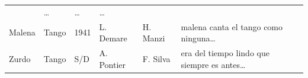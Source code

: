 \documentclass[]{article}
\begin{document}
\begin{longtable}[]{@{}llllll@{}}
\begin{minipage}[t]{0.06\columnwidth}
\end{minipage} & \begin{minipage}[t]{0.11\columnwidth}\raggedright\strut
\ldots{}\strut
\end{minipage} & \begin{minipage}[t]{0.11\columnwidth}\raggedright\strut
\ldots{}\strut
\end{minipage} & \begin{minipage}[t]{0.38\columnwidth}\raggedright\strut
\ldots{}\strut
\end{minipage}\tabularnewline
\begin{minipage}[t]{0.09\columnwidth}\raggedright\strut
Malena\strut
\end{minipage} & \begin{minipage}[t]{0.07\columnwidth}\raggedright\strut
Tango\strut
\end{minipage} & \begin{minipage}[t]{0.06\columnwidth}\raggedright\strut
1941\strut
\end{minipage} & \begin{minipage}[t]{0.11\columnwidth}\raggedright\strut
L. Demare\strut
\end{minipage} & \begin{minipage}[t]{0.11\columnwidth}\raggedright\strut
H. Manzi\strut
\end{minipage} & \begin{minipage}[t]{0.38\columnwidth}\raggedright\strut
malena canta el tango como ninguna\ldots{}\strut
\end{minipage}\tabularnewline
\begin{minipage}[t]{0.09\columnwidth}\raggedright\strut
Zurdo\strut
\end{minipage} & \begin{minipage}[t]{0.07\columnwidth}\raggedright\strut
Tango\strut
\end{minipage} & \begin{minipage}[t]{0.06\columnwidth}\raggedright\strut
S/D\strut
\end{minipage} & \begin{minipage}[t]{0.11\columnwidth}\raggedright\strut
A. Pontier\strut
\end{minipage} & \begin{minipage}[t]{0.11\columnwidth}\raggedright\strut
F. Silva\strut
\end{minipage} & \begin{minipage}[t]{0.38\columnwidth}\raggedright\strut
era del tiempo lindo que siempre es antes\ldots{}\strut
\end{minipage}\tabularnewline
\bottomrule
\end{longtable}
\end{document}
